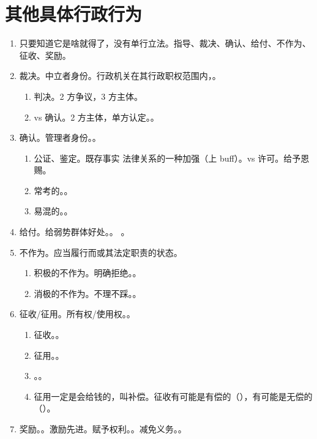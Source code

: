 \section{其他具体行政行为}
\begin{enumerate}
  \item 只要知道它是啥就得了，没有单行立法。指导、裁决、确认、给付、不作为、征收、奖励。
  \item 裁决。中立者身份。行政机关在其行政职权范围内，。
        \begin{enumerate}
          \item \ydy 判决。2 方争议，3 方主体。
          \item vs 确认。2 方主体，单方认定。。
        \end{enumerate}
  \item 确认。管理者身份。。
        \begin{enumerate}
          \item \ydy 公证、鉴定。既存事实 \hz 法律关系的一种加强（上 buff）。vs 许可。给予恩赐。
          \item 常考的。。
          \item 易混的。。
        \end{enumerate}
  \item 给付。给弱势群体好处。。
        。
  \item 不作为。应当履行而或其法定职责的状态。
        \begin{enumerate}
          \item 积极的不作为。明确拒绝。。
          \item 消极的不作为。不理不踩。。
        \end{enumerate}
  \item 征收/征用。所有权/使用权。。
        \begin{enumerate}
          \item 征收。。
          \item 征用。。
          \item {}。。
          \item 征用一定是会给钱的，叫补偿。征收有可能是有偿的（），有可能是无偿的（）。
        \end{enumerate}
  \item 奖励。。激励先进。赋予权利。。减免义务。。
\end{enumerate}
